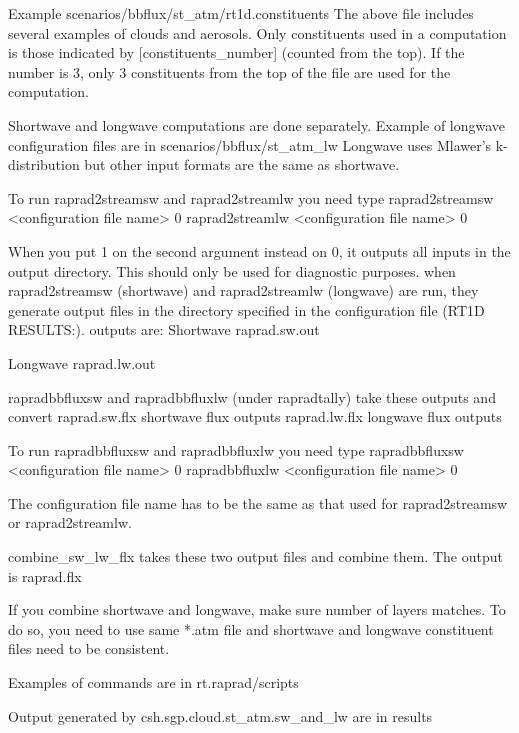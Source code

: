Example
scenarios/bbflux/st_atm/rt1d.constituents
The above file includes several examples of clouds and aerosols. Only constituents used in a computation is those
indicated by [constituents_number] (counted from the top). If the number is 3, only 3 constituents from the top
of the file are used for the computation.

Shortwave and longwave computations are done separately.
Example of longwave configuration files are in scenarios/bbflux/st_atm_lw
Longwave uses Mlawer's k-distribution but other input formats are the same as shortwave.

To run raprad2streamsw and raprad2streamlw you need type
raprad2streamsw <configuration file name> 0
raprad2streamlw <configuration file name> 0

When you put 1 on the second argument instead on 0, it outputs all inputs in the output directory. This should only be used for diagnostic purposes.
when raprad2streamsw (shortwave) and raprad2streamlw (longwave) are run, they generate output files in the
directory specified in the configuration file (RT1D RESULTS:).
outputs are:
Shortwave
raprad.sw.out 

Longwave 
raprad.lw.out

rapradbbfluxsw and rapradbbfluxlw (under rapradtally) take these outputs and convert
raprad.sw.flx   shortwave flux outputs
raprad.lw.flx   longwave flux outputs

To run rapradbbfluxsw and rapradbbfluxlw you need type
rapradbbfluxsw <configuration file name> 0
rapradbbfluxlw <configuration file name> 0

The configuration file name has to be the same as that used for raprad2streamsw or raprad2streamlw.

combine_sw_lw_flx takes these two output files and combine them. The output is
raprad.flx

If you combine shortwave and longwave, make sure number of layers matches.
To do so, you need to use same *.atm file and shortwave and longwave constituent files need to be consistent.

Examples of commands are in
rt.raprad/scripts

Output generated by csh.sgp.cloud.st_atm.sw_and_lw are in 
results

 
